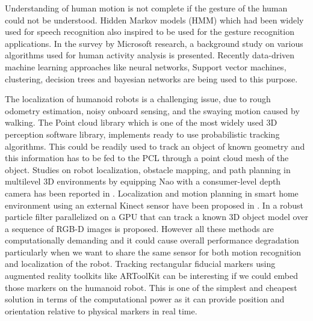 \documentclass{llncs}
\begin{document}
	Understanding of human motion is not complete if the gesture of the human could not be understood. Hidden Markov models (HMM) which had been widely used for speech recognition\cite{Rabiner1990} also inspired to be used for the gesture recognition applications. In the survey by Microsoft research\cite{KinectCV2013}, a background study on various algorithms used for human activity analysis is presented. Recently data-driven machine learning approaches like neural networks, Support vector machines, clustering, decision trees and bayesian networks are being used to this purpose\cite{KinectSDK2014}. %
	
	The localization of humanoid robots is a challenging issue, due to rough odometry estimation, noisy onboard sensing, and the swaying motion caused by walking\cite{Cervera2012}. The Point cloud library\cite{RusuPCL11} which is one of the most widely used 3D perception software library, implements ready to use probabilistic tracking algorithms\cite{RUeda2012}. This could be readily used to track an object of known geometry and this information has to be fed to the PCL through a point cloud mesh of the object. Studies on robot localization, obstacle mapping, and path planning in multilevel 3D environments by equipping Nao with a consumer-level depth camera has been reported in \cite{Maier2012}. Localization and motion planning in smart home environment using an external Kinect sensor have been proposed in \cite{Cervera2012}. In \cite{choi13_rgb_d_objec_track} a robust particle filter parallelized on a GPU that can track a known 3D object model over a sequence of RGB-D images is proposed. However all these methods are computationally demanding and it could cause overall performance degradation particularly when we want to share the same sensor for both motion recognition and localization of the robot.  Tracking rectangular fiducial markers using  augmented reality toolkits like ARToolKit\cite{Kato1999} can be interesting if we could embed those markers on the humanoid robot. This is one of the simplest and cheapest solution in terms of the computational power as it can provide position and orientation relative to physical markers in real time. 
	
\end{document}

